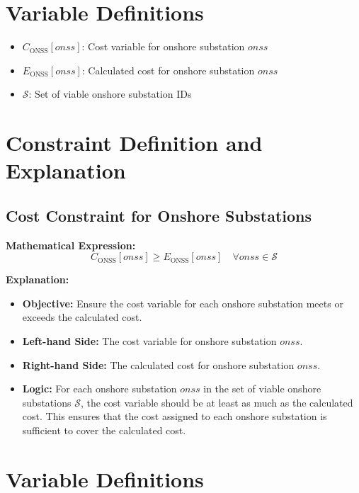 \section*{Variable Definitions}

\begin{itemize}
    \item \( C_{\text{ONSS}}[onss] \): Cost variable for onshore substation \( onss \)
    \item \( E_{\text{ONSS}}[onss] \): Calculated cost for onshore substation \( onss \)
    \item \( \mathcal{S} \): Set of viable onshore substation IDs
\end{itemize}

\section*{Constraint Definition and Explanation}

\subsection*{Cost Constraint for Onshore Substations}

\textbf{Mathematical Expression:}
\[
C_{\text{ONSS}}[onss] \geq E_{\text{ONSS}}[onss] \quad \forall onss \in \mathcal{S}
\]

\textbf{Explanation:}
\begin{itemize}
    \item \textbf{Objective:} Ensure the cost variable for each onshore substation meets or exceeds the calculated cost.
    \item \textbf{Left-hand Side:} The cost variable for onshore substation \( onss \).
    \item \textbf{Right-hand Side:} The calculated cost for onshore substation \( onss \).
    \item \textbf{Logic:} For each onshore substation \( onss \) in the set of viable onshore substations \( \mathcal{S} \), the cost variable should be at least as much as the calculated cost. This ensures that the cost assigned to each onshore substation is sufficient to cover the calculated cost.
\end{itemize}


\section*{Variable Definitions}

